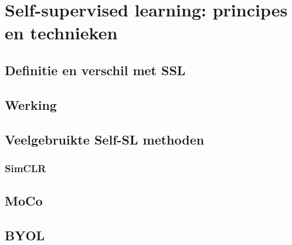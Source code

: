 \section{Self-supervised learning: principes en technieken}

\subsection{Definitie en verschil met SSL}

\lipsum[1]

\subsection{Werking}

\lipsum[1]

\subsection{Veelgebruikte Self-SL methoden}

\lipsum[1]

\subsubsection{SimCLR}

\lipsum[1]

\subsection{MoCo}

\lipsum[1]

\subsection{BYOL}

\lipsum[1]